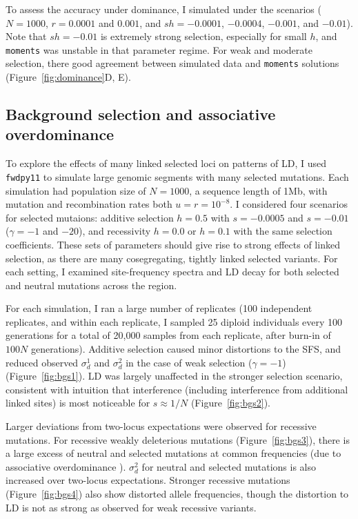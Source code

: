 \documentclass[]{article}
\begin{document}
To assess the accuracy under dominance, I simulated under the
\citet{Roze2021-cf} scenarios (\(N=1000\), \(r=0.0001\) and \(0.001\), and
\(sh=-0.0001\), \(-0.0004\), \(-0.001\), and \(-0.01\)). Note that \(sh=-0.01\)
is extremely strong selection, especially for small \(h\), and \texttt{moments}
was unstable in that parameter regime. For weak and moderate selection, there
good agreement between simulated data and \texttt{moments} solutions
(Figure~\ref{fig:dominance}D, E).

\subsection{Background selection and associative overdominance}\label{sec:bgs}

To explore the effects of many linked selected loci on patterns of LD, I used
\texttt{fwdpy11} \citep{Thornton2014-pn,Thornton2019-qc} to simulate large
genomic segments with many selected mutations. Each simulation had population
size of \(N=1000\), a sequence length of 1Mb, with mutation and recombination
rates both \(u=r=10^{-8}\). I considered four scenarios for selected mutaions:
additive selection \(h=0.5\) with \(s=-0.0005\) and \(s=-0.01\) (\(\gamma=-1\)
and \(-20\)), and recessivity \(h=0.0\) or \(h=0.1\) with the same selection
coefficients. These sets of parameters should give rise to strong effects of
linked selection, as there are many cosegregating, tightly linked selected
variants. For each setting, I examined site-frequency spectra and LD decay for
both selected and neutral mutations across the region.

For each simulation, I ran a large number of replicates (100 independent
replicates, and within each replicate, I sampled 25 diploid individuals every
100 generations for a total of 20,000 samples from each replicate, after
burn-in of \(100N\) generations). Additive selection caused minor distortions
to the SFS, and reduced observed \(\sigma_d^1\) and \(\sigma_d^2\) in the case
of weak selection (\(\gamma=-1\)) (Figure~\ref{fig:bgs1}). LD was largely
unaffected in the stronger selection scenario, consistent with intuition that
interference (including interference from additional linked sites) is most
noticeable for \(s\approx1/N\) (Figure~\ref{fig:bgs2}).

Larger deviations from two-locus expectations were observed for recessive
mutations. For recessive weakly deleterious mutations (Figure~\ref{fig:bgs3}),
there is a large excess of neutral and selected mutations at common frequencies
(due to associative overdominance \citep{Zhao2016-bb}). \(\sigma_d^2\) for
neutral and selected mutations is also increased over two-locus expectations.
Stronger recessive mutations (Figure~\ref{fig:bgs4}) also show distorted allele
frequencies, though the distortion to LD is not as strong as observed for weak
recessive variants.
\end{document}
